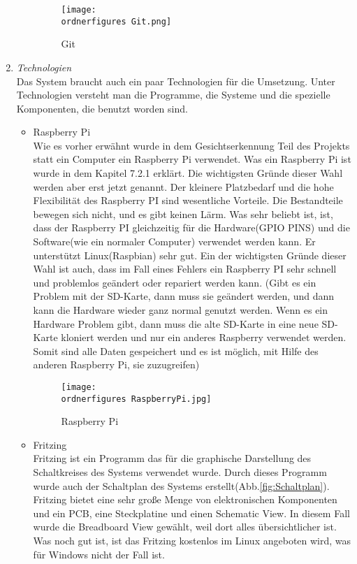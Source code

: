 \begin{enumerate}
\begin{itemize}
		\cite{Git}
		\begin{figure}[H]
			\texttt{[image: \\ordnerfigures Git.png]}
			\centering
			\caption{Git\cite{GitBild}}
		\end{figure}
	\end{itemize}
	\item \textit{Technologien} \\
	Das System braucht auch ein paar Technologien für die Umsetzung. Unter Technologien versteht man die Programme, die Systeme und die spezielle Komponenten, die benutzt worden sind.
	\begin{itemize}
		\item Raspberry Pi \\
		Wie es vorher erwähnt wurde in dem Gesichtserkennung Teil des Projekts statt ein Computer ein Raspberry Pi verwendet. Was ein Raspberry Pi ist wurde in dem Kapitel 7.2.1 erklärt. Die wichtigsten Gründe dieser Wahl werden aber erst jetzt genannt. Der kleinere Platzbedarf und die hohe Flexibilität des Raspberry PI sind wesentliche Vorteile. Die Bestandteile bewegen sich nicht, und es gibt keinen Lärm. Was sehr beliebt ist, ist, dass der Raspberry PI gleichzeitig für die Hardware(GPIO PINS) und die Software(wie ein normaler Computer) verwendet werden kann. Er unterstützt Linux(Raspbian) sehr gut. Ein der wichtigsten Gründe dieser Wahl ist auch, dass im Fall eines Fehlers ein Raspberry PI sehr schnell und problemlos geändert oder repariert werden kann. (Gibt es ein Problem mit der SD-Karte, dann muss sie geändert werden, und dann kann die Hardware wieder ganz normal genutzt werden. Wenn es ein Hardware Problem gibt, dann muss die alte SD-Karte in eine neue SD-Karte kloniert werden und nur ein anderes Raspberry verwendet werden. Somit sind alle Daten gespeichert und es ist möglich, mit Hilfe des anderen Raspberry Pi, sie zuzugreifen)
		\begin{figure}[H]
			\texttt{[image: \\ordnerfigures RaspberryPi.jpg]}
			\centering
			\caption{Raspberry Pi\cite{RaspberryBild}}
		\end{figure}
		\item Fritzing \\
		Fritzing ist ein Programm das für die graphische Darstellung des Schaltkreises des Systems verwendet wurde. Durch dieses Programm wurde auch der Schaltplan des Systems erstellt(Abb.\ref{fig:Schaltplan}). Fritzing bietet eine sehr große Menge von elektronischen Komponenten und ein PCB, eine Steckplatine und einen Schematic View. In diesem Fall wurde die Breadboard View gewählt, weil dort alles übersichtlicher ist. Was noch gut ist, ist das Fritzing kostenlos im Linux angeboten wird, was für Windows nicht der Fall ist.

\end{itemize}
\end{enumerate}
